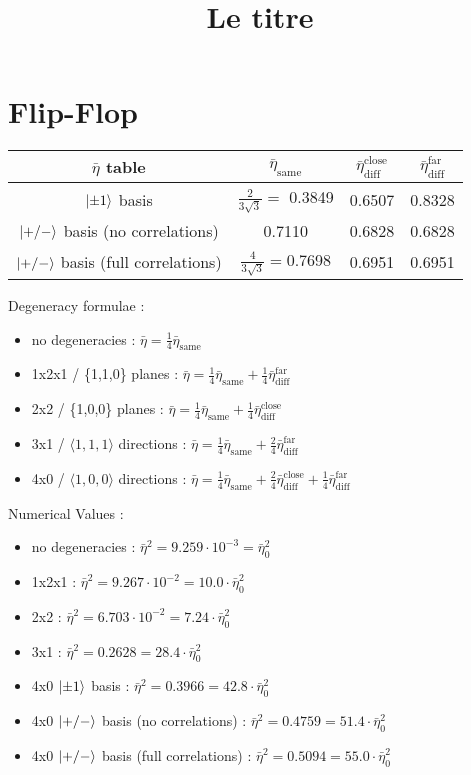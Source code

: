 \documentclass[a4paper]{article}
\title{Le titre}
\begin{document}
\centering

\section{Flip-Flop}
\begin{tabular}{cccc}

\hline
$\bar{\eta}$ table & $\bar{\eta}_\textrm{same}$ & $\bar{\eta}_\textrm{diff}^\textrm{close}$ & $\bar{\eta}_\textrm{diff}^\textrm{far}$ \\
\hline
$\ket{\pm 1}$ basis & $\frac{2}{3\sqrt{3}}=$ 0.3849 & 0.6507 & 0.8328 \\
$\ket{+/-}$ basis (no correlations) & 0.7110  & 0.6828 & 0.6828 \\
$\ket{+/-}$ basis (full correlations) & $\frac{4}{3\sqrt{3}}=$0.7698  & 0.6951 & 0.6951 \\
\hline
\end{tabular}

\bigskip

Degeneracy formulae :
\begin{itemize}
\medskip
\item no degeneracies : $\bar{\eta}=\frac{1}{4}\bar{\eta}_\textrm{same}$
\medskip
\item 1x2x1 / \{1,1,0\} planes : $\bar{\eta}=\frac{1}{4}\bar{\eta}_\textrm{same} + \frac{1}{4}\bar{\eta}_\textrm{diff}^\textrm{far}$
\medskip
\item 2x2 / \{1,0,0\} planes : $\bar{\eta}=\frac{1}{4}\bar{\eta}_\textrm{same} + \frac{1}{4}\bar{\eta}_\textrm{diff}^\textrm{close}$
\medskip
\item 3x1 / $\langle 1,1,1 \rangle$ directions : $\bar{\eta}=\frac{1}{4}\bar{\eta}_\textrm{same} + \frac{2}{4}\bar{\eta}_\textrm{diff}^\textrm{far}$
\medskip
\item 4x0 / $\langle 1,0,0 \rangle$ directions : $\bar{\eta}=\frac{1}{4}\bar{\eta}_\textrm{same} + \frac{2}{4}\bar{\eta}_\textrm{diff}^\textrm{close} + \frac{1}{4}\bar{\eta}_\textrm{diff}^\textrm{far}$
\end{itemize}
\bigskip
Numerical Values :
\begin{itemize}
\medskip
\item no degeneracies : $\bar{\eta}^2 = 9.259\cdot 10^{-3} = \bar{\eta}^2_0$

\item 1x2x1 : $\bar{\eta}^2 = 9.267\cdot 10^{-2} = 10.0 \cdot \bar{\eta}^2_0$
\item 2x2 : $\bar{\eta}^2 = 6.703\cdot 10^{-2} = 7.24 \cdot \bar{\eta}^2_0$
\item 3x1 : $\bar{\eta}^2 = 0.2628 = 28.4 \cdot \bar{\eta}^2_0$
\item 4x0 $\ket{\pm 1}$ basis : $\bar{\eta}^2 = 0.3966 = 42.8 \cdot \bar{\eta}^2_0$
\item 4x0 $\ket{+/-}$ basis (no correlations) : $\bar{\eta}^2 = 0.4759 = 51.4 \cdot \bar{\eta}^2_0$
\item 4x0 $\ket{+/-}$ basis (full correlations) : $\bar{\eta}^2 = 0.5094 = 55.0 \cdot \bar{\eta}^2_0$

\end{itemize}
\end{document}
